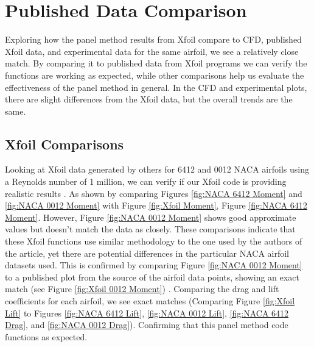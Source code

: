 \documentclass{article}
\begin{document}
\section{Published Data Comparison}
Exploring how the panel method results from Xfoil compare to CFD, published Xfoil data, and experimental data for the same airfoil, we see a relatively close match. By comparing it to published data from Xfoil programs we can verify the functions are working as expected, while other comparisons help us evaluate the effectiveness of the panel method in general. In the CFD and experimental plots, there are slight differences from the Xfoil data, but the overall trends are the same.

\subsection{Xfoil Comparisons}
Looking at Xfoil data generated by others for 6412 and 0012 NACA airfoils using a Reynolds number of 1 million, we can verify if our Xfoil code is providing realistic results \cite{aerotoolbox_lift_drag_moment}. As shown by comparing Figures \ref{fig:NACA 6412 Moment} and \ref{fig:NACA 0012 Moment} with Figure \ref{fig:Xfoil Moment}, Figure \ref{fig:NACA 6412 Moment}. However, Figure \ref{fig:NACA 0012 Moment} shows good approximate values but doesn't match the data as closely. These comparisons indicate that these Xfoil functions use similar methodology to the one used by the authors of the article, yet there are potential differences in the particular NACA airfoil datasets used. This is confirmed by comparing Figure \ref{fig:NACA 0012 Moment} to a published plot from the source of the airfoil data points, showing an exact match (see Figure \ref{fig:Xfoil 0012 Moment}) \cite{naca0012h}. Comparing the drag and lift coefficients for each airfoil, we see exact matches (Comparing Figure \ref{fig:Xfoil Lift} to Figures \ref{fig:NACA 6412 Lift}, \ref{fig:NACA 0012 Lift}, \ref{fig:NACA 6412 Drag},  and \ref{fig:NACA 0012 Drag}). Confirming that this panel method code functions as expected.
\end{document}
